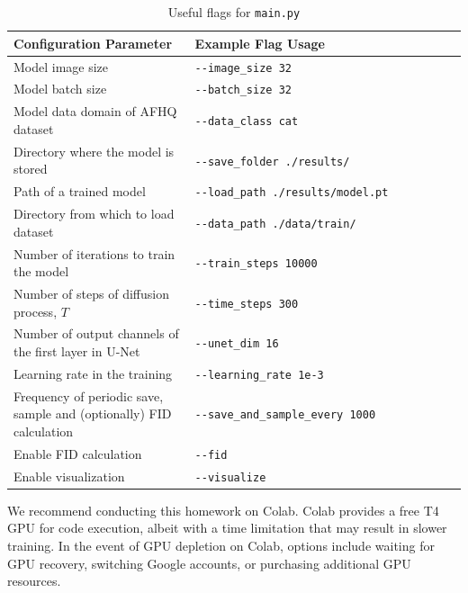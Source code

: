 \documentclass[11pt,addpoints,answers]{exam}
\begin{document}
\begin{questions}
\begin{table}[h!]
\centering
\begin{tabular}{|p{0.4\linewidth}|p{0.6\linewidth}|}
\hline
Configuration Parameter & Example Flag Usage \\ \hline
Model image size &  \lstinline|--image_size 32|  \\ \hline
Model batch size &  \lstinline|--batch_size 32| \\ \hline
Model data domain of AFHQ dataset &  \lstinline|--data_class cat| \\ \hline
Directory where the model is stored &  \lstinline|--save_folder ./results/| \\ \hline
Path of a trained model &  \lstinline|--load_path ./results/model.pt| \\ \hline
Directory from which to load dataset &  \lstinline|--data_path ./data/train/| \\ \hline
Number of iterations to train the model &  \lstinline|--train_steps 10000| \\ \hline
Number of steps of diffusion process, $T$ &  \lstinline|--time_steps 300| \\ \hline
Number of output channels of the first layer in U-Net &  \lstinline|--unet_dim 16| \\ \hline
Learning rate in the training &  \lstinline|--learning_rate 1e-3| \\ \hline
Frequency of periodic save, sample and (optionally) FID calculation &  \lstinline|--save_and_sample_every 1000| \\ \hline
Enable FID calculation &  \lstinline|--fid| \\ \hline
Enable visualization &  \lstinline|--visualize| \\ \hline

\end{tabular}
\caption{Useful flags for \lstinline{main.py}}
\label{table:flag}
\end{table}


We recommend conducting this homework on Colab. Colab provides a free T4 GPU for code execution, albeit with a time limitation that may result in slower training. In the event of GPU depletion on Colab, options include waiting for GPU recovery, switching Google accounts, or purchasing additional GPU resources.


\end{questions}
\end{document}
